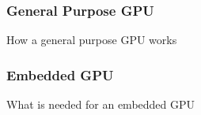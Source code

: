 \subsubsection*{General Purpose GPU}
How a general purpose GPU works


\subsubsection*{Embedded GPU}
What is needed for an embedded GPU
